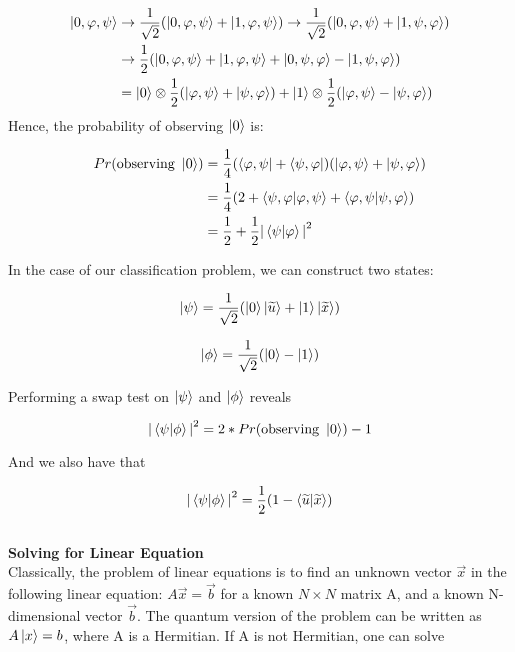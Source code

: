 \documentclass[11pt]{article}
\begin{document}
\begin{equation}
\begin{split}
\ket{0, \varphi, \psi} &\rightarrow \frac{1}{\sqrt{2}} (\ket{0, \varphi, \psi} + \ket{1, \varphi, \psi}) \rightarrow \frac{1}{\sqrt{2}} (\ket{0, \varphi, \psi} + \ket{1, \psi, \varphi}) \\
&\rightarrow \frac{1}{2} (\ket{0, \varphi, \psi} + \ket{1, \varphi, \psi} + \ket{0, \psi, \varphi} - \ket{1, \psi, \varphi}) \\
&= \ket{0} \otimes \frac{1}{2} (\ket{\varphi, \psi} + \ket{\psi, \varphi}) + \ket{1} \otimes \frac{1}{2} (\ket{\varphi, \psi} - \ket{\psi, \varphi})
\end{split}
\end{equation}
Hence, the probability of observing $\ket{0}$  is: 

\begin{equation}
\begin{split}
Pr(\text{observing } \ket{0}) &=  \frac{1}{4} (\bra{\varphi, \psi} + \bra{\psi, \varphi})(\ket{\varphi, \psi} + \ket{\psi, \varphi}) \\
&= \frac{1}{4}(2 + \bra{\psi, \varphi}\ket{\varphi, \psi} + \bra{\varphi, \psi}\ket{\psi, \varphi}) \\
&= \frac{1}{2} + \frac{1}{2} {\vert \bra{\psi}\ket{\varphi} \vert}^{2}
\end{split}
\end{equation}

In the case of our classification problem, we can construct two states: 

$$\ket{\psi} = \frac{1}{\sqrt{2}} (\ket{0}\ket{\widetilde{u}} + \ket{1}\ket{\widetilde{x}})$$

$$\ket{\phi} = \frac{1}{\sqrt{2}}(\ket{0} - \ket{1})$$

Performing a swap test on $\ket{\psi}$ and $\ket{\phi}$ reveals 

$${\vert \bra{\psi}\ket{\phi} \vert}^{2} = 2*Pr(\text{observing } \ket{0}) - 1$$

And we also have that 

$${\vert \bra{\psi}\ket{\phi} \vert}^{2} = \frac{1}{2} (1 - \bra{\widetilde{u}}\ket{\widetilde{x}})$$ \\


\textbf{\large Solving for Linear Equation} \\

Classically, the problem of linear equations is to find an unknown vector $\vec{x}$ in the following linear equation: $A\vec{x} = \vec{b}$ for a known $N \times N$ matrix A, and a known N-dimensional vector $\vec{b}$. The quantum version of the problem can be written as $A\ket{x} = b$, where A is a Hermitian. If A is not Hermitian, one can solve 
\end{document}
